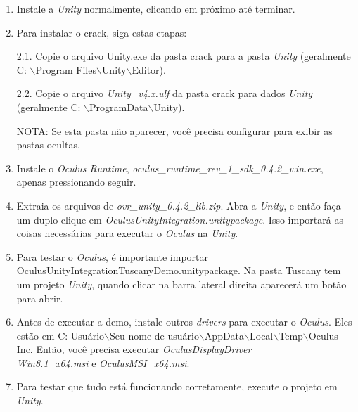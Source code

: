 \begin{enumerate}
\item Instale a \textit{Unity} normalmente, clicando em próximo até terminar.

\item Para instalar o crack, siga estas etapas:

2.1. Copie o arquivo Unity.exe da pasta crack para a pasta \textit{Unity} (geralmente C: $\backslash$Program Files$\backslash$Unity$\backslash$Editor).

2.2. Copie o arquivo \textit{Unity\_v4.x.ulf} da pasta crack para dados \textit{Unity} (geralmente C: $\backslash$ProgramData$\backslash$Unity).

NOTA: Se esta pasta não aparecer, você precisa configurar para exibir as pastas ocultas.

\item Instale o \textit{Oculus Runtime}, \textit{oculus\_runtime\_rev\_1\_sdk\_0.4.2\_win.exe}, apenas pressionando seguir.

\item Extraia os arquivos de \textit{ovr\_unity\_0.4.2\_lib.zip}. Abra a \textit{Unity}, e então faça um duplo clique em \textit{OculusUnityIntegration.unitypackage}. Isso importará as coisas necessárias para executar o \textit{Oculus} na \textit{Unity}.

\item Para testar o \textit{Oculus}, é importante importar OculusUnityIntegrationTuscanyDemo.unitypackage. Na pasta Tuscany tem um projeto \textit{Unity}, quando clicar na barra lateral direita aparecerá um botão para abrir.

\item Antes de executar a demo, instale outros \textit{drivers} para executar o \textit{Oculus}. Eles estão em C: Usuário$\backslash$Seu nome de usuário$\backslash$AppData$\backslash$Local$\backslash$Temp$\backslash$Oculus Inc. Então, você precisa executar \textit{OculusDisplayDriver\_\\Win8.1\_x64.msi} e \textit{OculusMSI\_x64.msi}.

\item Para testar que tudo está funcionando corretamente, execute o projeto em \textit{Unity}.
\end{enumerate}
